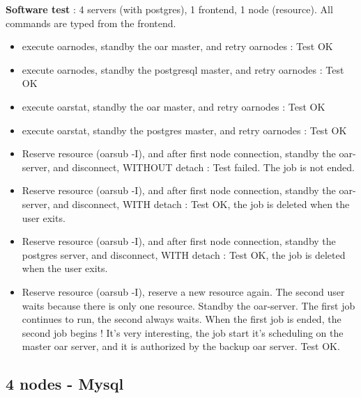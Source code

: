 \documentclass[a4paper,10pt]{report}
\begin{document}
\textbf{Software test} : 4 servers (with postgres), 1 frontend, 1 node (resource). All commands are typed from the frontend.
\begin{itemize}
 \item execute oarnodes, standby the oar master, and retry oarnodes : Test OK
 \item execute oarnodes, standby the postgresql master, and retry oarnodes : Test OK
 \item execute oarstat, standby the oar master, and retry oarnodes : Test OK
 \item execute oarstat, standby the postgres master, and retry oarnodes : Test OK
 \item Reserve resource (oarsub -I), and after first node connection, standby the oar-server, and disconnect, WITHOUT detach : Test failed. The job is not ended.
 \item Reserve resource (oarsub -I), and after first node connection, standby the oar-server, and disconnect, WITH detach : Test OK, the job is deleted when the user exits.
 \item Reserve resource (oarsub -I), and after first node connection, standby the postgres server, and disconnect, WITH detach : Test OK, the job is deleted when the user exits.
 \item Reserve resource (oarsub -I), reserve a new resource again. The second user waits because there is only one resource. Standby the oar-server. The first job continues to run, the second always waits. When the first job is ended, the second job begins ! It's very interesting, the job start it's scheduling on the master oar server, and it is authorized  by the backup oar server. Test OK.
\end{itemize}


\subsection{4 nodes - Mysql}
\end{document}
